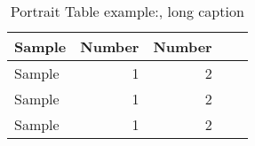 

\begin{longtable}{@{}l *{2}{rr}}
\caption[Portrait Table, short caption]{Portrait Table example:, long caption}
\label{table:portrait_table}
\\
%   
\toprule%


 {\bfseries Sample} & {\bfseries Number } & {\bfseries Number}  
\\



\cmidrule[0.4pt](r{0.125em}){1-1}%
\cmidrule[0.4pt](lr{0.125em}){2-3}%
\cmidrule[0.4pt](lr{0.125em}){4-5}%


  \endfirsthead

\endhead



Sample & 1& 2
\\

\myrowcolour%
Sample & 1 & 2
\\
Sample & 1 & 2
\\


\bottomrule

\end{longtable}